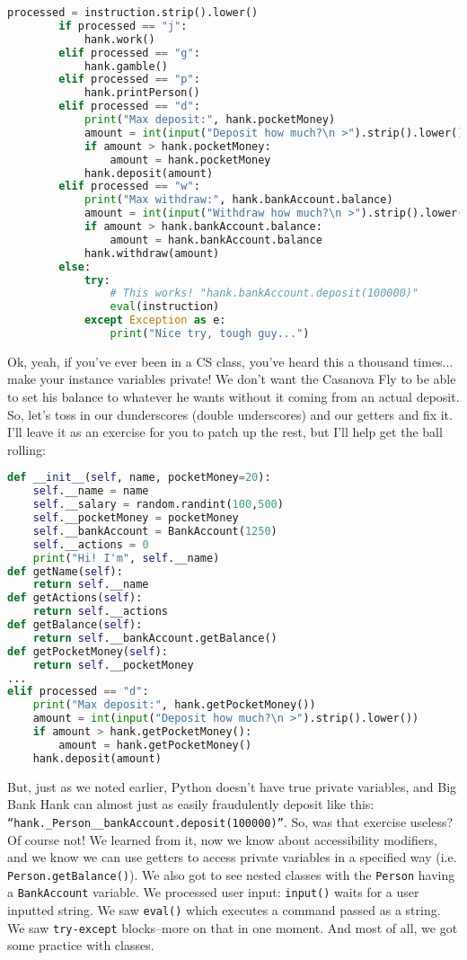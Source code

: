 \documentclass[12pt, twoside, reqno]{book}
\begin{document}
\begin{lstlisting}[language=Python]
        processed = instruction.strip().lower()
        if processed == "j":
            hank.work()
        elif processed == "g":
            hank.gamble()
        elif processed == "p":
            hank.printPerson()
        elif processed == "d":
            print("Max deposit:", hank.pocketMoney)
            amount = int(input("Deposit how much?\n >").strip().lower())
            if amount > hank.pocketMoney: 
                amount = hank.pocketMoney
            hank.deposit(amount)
        elif processed == "w":
            print("Max withdraw:", hank.bankAccount.balance)
            amount = int(input("Withdraw how much?\n >").strip().lower())
            if amount > hank.bankAccount.balance: 
                amount = hank.bankAccount.balance
            hank.withdraw(amount)
        else:
            try:
                # This works! "hank.bankAccount.deposit(100000)"
                eval(instruction)
            except Exception as e:
                print("Nice try, tough guy...")
\end{lstlisting}

Ok, yeah, if you've ever been in a CS class, you've heard this a thousand times... make your instance variables private! We don't want the Casanova Fly to be able to set his balance to whatever he wants without it coming from an actual deposit. So, let's toss in our dunderscores (double underscores) and our getters and fix it. I'll leave it as an exercise for you to patch up the rest, but I'll help get the ball rolling:
\begin{lstlisting}[language=Python]
def __init__(self, name, pocketMoney=20):
    self.__name = name
    self.__salary = random.randint(100,500)
    self.__pocketMoney = pocketMoney
    self.__bankAccount = BankAccount(1250)
    self.__actions = 0
    print("Hi! I'm", self.__name)
def getName(self):
    return self.__name
def getActions(self):
    return self.__actions
def getBalance(self):
    return self.__bankAccount.getBalance()
def getPocketMoney(self):
    return self.__pocketMoney
...
elif processed == "d":
    print("Max deposit:", hank.getPocketMoney())
    amount = int(input("Deposit how much?\n >").strip().lower())
    if amount > hank.getPocketMoney(): 
        amount = hank.getPocketMoney()
    hank.deposit(amount)
\end{lstlisting}

But, just as we noted earlier, Python doesn't have true private variables, and Big Bank Hank can almost just as easily fraudulently deposit like this: \texttt{``hank.\_Person\_\_bankAccount.deposit(100000)''}. So, was that exercise useless? Of course not! We learned from it, now we know about accessibility modifiers, and we know we can use getters to access private variables in a specified way (i.e. \texttt{Person.getBalance()}). We also got to see nested classes with the \texttt{Person} having a \texttt{BankAccount} variable. We processed user input: \texttt{input()} waits for a user inputted string. We saw \texttt{eval()} which executes a command passed as a string. We saw \texttt{try-except} blocks--more on that in one moment. And most of all, we got some practice with classes.
\end{document}
